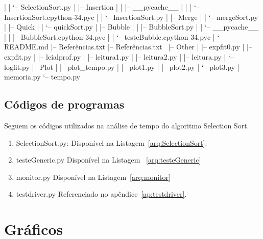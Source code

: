 \documentclass[12pt,a4paper,twoside]{report}
\begin{document}
\begin{terminal}
|   |   `-- SelectionSort.py
|   |-- Insertion
|   |   |-- __pycache__
|   |   |   `-- InsertionSort.cpython-34.pyc
|   |   `-- InsertionSort.py
|   |-- Merge
|   |   `-- mergeSort.py
|   |-- Quick
|   |   `-- quickSort.py
|   |-- Bubble
|   |   |-- BubbleSort.py
|   |   `-- __pycache__
|   |       |-- BubbleSort.cpython-34.pyc
|   |       `-- testeBubble.cpython-34.pyc
|   `-- README.md
|-- Referências.txt
|-- Referências.txt~
|-- Other
|   |-- expfit0.py
|   |-- expfit.py
|   |-- leialprof.py
|   |-- leitura1.py
|   |-- leitura2.py
|   |-- leitura.py
|   `-- logfit.py
|-- Plot
|   |-- plot_tempo.py
|   |-- plot1.py
|   |-- plot2.py
|   `-- plot3.py
|-- memoria.py
`-- tempo.py



\end{terminal}

\section{Códigos de programas}
Seguem os códigos utilizados na análise de tempo do algoritmo Selection Sort.
\begin{enumerate}

\item SelectionSort.py:
Disponível na Listagem~\ref{arq:SelectionSort}.


\item testeGeneric.py
Disponível na Listagem ~\ref{arq:testeGeneric}


\item monitor.py
Disponível na Listagem~\ref{arq:monitor}



\item testdriver.py
 Referenciado no apêndice~\ref{ap:testdriver}.
\end{enumerate}


\chapter{Gráficos}
\end{document}
